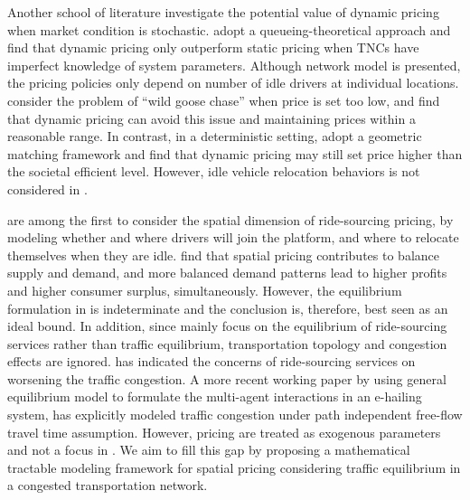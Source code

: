 \documentclass[review]{elsarticle}
\begin{document}
Another school of literature investigate the potential value of dynamic pricing when market condition is stochastic\citep{banerjee2015pricing, cachon2017role, castillo2017surge, taylor2018demand, gurvich2019operations}. \cite{banerjee2015pricing} adopt a queueing-theoretical approach and find that dynamic pricing only outperform static pricing when TNCs have imperfect knowledge of system parameters. Although network model is presented, the pricing policies only depend on number of idle drivers at individual locations. \cite{castillo2017surge} consider the problem of ``wild goose chase'' when price is set too low, and find that dynamic pricing can avoid this issue and maintaining prices within a reasonable range. In contrast, in a deterministic setting, \cite{zha2018geometric} adopt a geometric matching framework and find that dynamic pricing may still set price higher than the societal efficient level. However, idle vehicle relocation behaviors is not considered in \citep{zha2018geometric}.

\cite{bimpikis2019spatial} are among the first to consider the spatial dimension of ride-sourcing pricing, by modeling whether and where drivers will join the platform, and where to relocate themselves when they are idle. \cite{bimpikis2019spatial} find that spatial pricing contributes to balance supply and demand, and more balanced demand patterns lead to higher profits and higher consumer surplus, simultaneously. However, the equilibrium formulation in \citep{bimpikis2019spatial} is indeterminate and the conclusion is, therefore, best seen as an ideal bound\citep{zha2018geometric}. In addition, since \cite{bimpikis2019spatial} mainly focus on the equilibrium of ride-sourcing services rather than traffic equilibrium, transportation topology and congestion effects are ignored. \cite{nie2017can} has indicated the concerns of ride-sourcing services on worsening the traffic congestion. A more recent working paper by \cite{ban2018general} using general equilibrium model to formulate the multi-agent interactions in an e-hailing system, has explicitly modeled traffic congestion under path independent free-flow travel time assumption. However, pricing are treated as exogenous parameters and not a focus in \citep{ban2018general}. We aim to fill this gap by proposing a mathematical tractable modeling framework for spatial pricing considering traffic equilibrium in a congested transportation network. 


\end{document}
